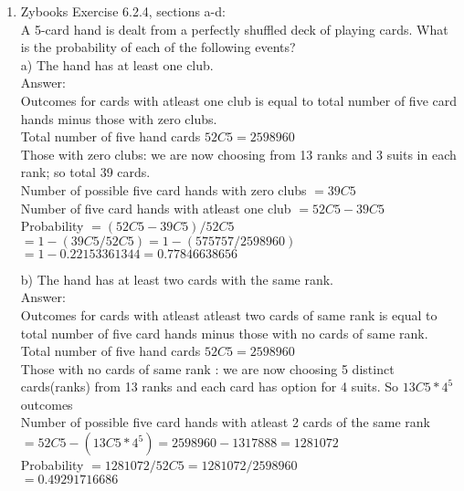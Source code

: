 \documentclass[14pt]{extreport}
\begin{document}
\begin{enumerate}[label=(\alph*)]
\item Zybooks Exercise 6.2.4, sections a-d: \\
A 5-card hand is dealt from a perfectly shuffled deck of playing cards. What is the probability of each of the following events?\\

a) The hand has at least one club.\\

Answer:\\
Outcomes for cards with atleast one club is equal to total number of five card hands minus those with zero clubs. \\

Total number of five hand cards $ 52C5 = 2598960$\\
Those with zero clubs: we are now choosing from 13 ranks and 3 suits in each rank; so total 39 cards. \\
Number of possible five card hands with zero clubs $ = 39C5 $ \\
Number of five card hands with atleast one club $ = 52C5 - 39C5$ \\

Probability $= \left(52C5 - 39C5\right) / 52C5$ \\
    $ = 1 - \left(39C5 / 52C5\right) = 1 - \left( 575757/ 2598960\right)$ \\
    $ = 1 - 0.22153361344 = 0.77846638656$
    \newline
    
b) The hand has at least two cards with the same rank.\\

Answer:\\
Outcomes for cards with atleast atleast two cards of same rank is equal to total number of five card hands minus those with no cards of same rank. \\

Total number of five hand cards $ 52C5 = 2598960$\\
Those with no cards of same rank : we are now choosing 5 distinct cards(ranks) from 13 ranks and each card has option for 4 suits. So $ 13C5 * 4^{5} $ outcomes \\
Number of possible five card hands with atleast 2 cards of the same rank $ = 52C5 - (13C5 * 4^{5}) = 2598960 - 1317888 = 1281072 $\\

Probability $ = 1281072 / 52C5 = 1281072 / 2598960 $ \\
 $ = 0.49291716686$
\newline
\newpage


\end{enumerate}
\end{document}
